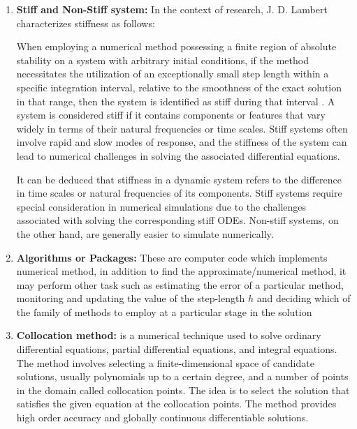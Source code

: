 \documentclass[a4paper, twoside]{report} %
\begin{document}
\begin{enumerate}
		\item \textbf{Stiff and Non-Stiff system:}
		In the context of research, J. D. Lambert characterizes stiffness as follows:

		When employing a numerical method possessing a finite region of absolute stability on a system with arbitrary initial conditions, if the method necessitates the utilization of an exceptionally small step length within a specific integration interval, relative to the smoothness of the exact solution in that range, then the system is identified as stiff during that interval \cite{lambert1977}.
		A system is considered stiff if it contains components or features that vary widely in terms of their natural frequencies or time scales. Stiff systems often involve rapid and slow modes of response, and the stiffness of the system can lead to numerical challenges in solving the associated differential equations.


		It can be deduced that stiffness in a dynamic system refers to the difference in time scales or natural frequencies of its components. Stiff systems require special consideration in numerical simulations due to the challenges associated with solving the corresponding stiff ODEs. Non-stiff systems, on the other hand, are generally easier to simulate numerically.

		\item \textbf{Algorithms or Packages:} These are computer code which implements numerical method, in addition to find the approximate/numerical method, it may perform other task such as estimating the error of a particular method, monitoring and updating the value of the step-length $h$ and deciding which of the family of methods to employ at a particular stage in the solution \cite{lambert1977}

		\item \textbf{Collocation method:}  is a numerical technique used to solve ordinary differential equations, partial differential equations, and integral equations. The method involves selecting a finite-dimensional space of candidate solutions, usually polynomials up to a certain degree, and a number of points in the domain called collocation points. The idea is to select the solution that satisfies the given equation at the collocation points. The method provides high order accuracy and globally continuous differentiable solutions. \cite{enwiki:1166346639}


\end{enumerate}
\end{document}
